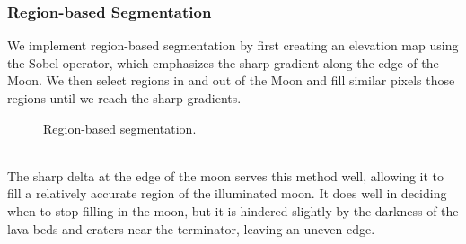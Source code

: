\documentclass[]{article}
\begin{document}
\subsubsection*{Region-based Segmentation}
We implement region-based segmentation by first creating an elevation map using the Sobel operator, which emphasizes the sharp gradient along the edge of the Moon. We then select regions in and out of the Moon and fill similar pixels those regions until we reach the sharp gradients.
\begin{figure}[h]
\centering
{}
\caption{Region-based segmentation.}
\end{figure}
\\
The sharp delta at the edge of the moon serves this method well, allowing it to fill a relatively accurate region of the illuminated moon. It does well in deciding when to stop filling in the moon, but it is hindered slightly by the darkness of the lava beds and craters near the terminator, leaving an uneven edge.
\end{document}
